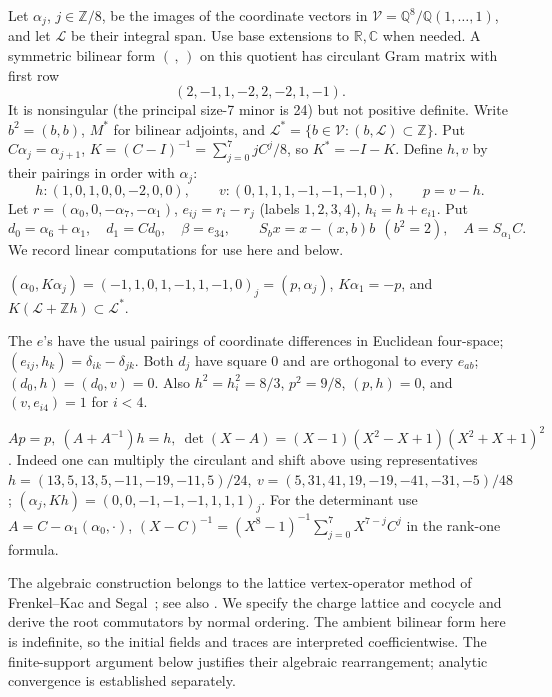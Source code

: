 Let \(\alpha_j\), \(j\in\mathbb Z/8\), be the images of the coordinate vectors in \(\mathcal V=\mathbb Q^8/\mathbb Q(1,\ldots,1)\), and let \(\mathcal L\) be their integral span. Use base extensions to \(\mathbb R,\mathbb C\) when needed. A symmetric bilinear form \((\, ,\,)\) on this quotient has circulant Gram matrix with first row
\[
 (2,-1,1,-2,2,-2,1,-1).
\]
It is nonsingular (the principal size-7 minor is 24) but not positive definite. Write \(b^2=(b,b)\), \(M^*\) for bilinear adjoints, and \(\mathcal L^*=\{b\in\mathcal V:(b,\mathcal L)\subset\mathbb Z\}\). Put \(C\alpha_j=\alpha_{j+1}\), \(K=(C-I)^{-1}=\sum_{j=0}^7 j C^j/8\), so \(K^*=-I-K\). Define \(h,v\) by their pairings in order with \(\alpha_j\):
\[
 h:(1,0,1,0,0,-2,0,0),\qquad v:(0,1,1,1,-1,-1,-1,0),\qquad p=v-h.
\]
Let \(r=(\alpha_0,0,-\alpha_7,-\alpha_1)\), \(e_{ij}=r_i-r_j\) (labels \(1,2,3,4\)), \(h_i=h+e_{i1}\). Put
\[
 d_0=\alpha_6+\alpha_1,\quad d_1=Cd_0,\quad \beta=e_{34},\qquad
 S_b x=x-(x,b)b\ \ (b^2=2),\quad A=S_{\alpha_1} C .
\]
We record linear computations for use here and below.
\par\noindent\textbullet\quad \((\alpha_0,K\alpha_j)=(-1,1,0,1,-1,1,-1,0)_j=(p,\alpha_j)\), \(K\alpha_1=-p\), and \(K(\mathcal L+\mathbb Z h)\subset\mathcal L^*\).
\par\noindent\textbullet\quad The \(e\)'s have the usual pairings of coordinate differences in Euclidean four-space; \((e_{ij},h_k)=\delta_{ik}-\delta_{jk}\). Both \(d_j\) have square 0 and are orthogonal to every \(e_{ab}\); \((d_0,h)=(d_0,v)=0\). Also \(h^2=h_i^2=8/3\), \(p^2=9/8\), \((p,h)=0\), and \((v,e_{i4})=1\) for \(i<4\).
\par\noindent\textbullet\quad \(Ap=p,\ (A+A^{-1})h=h,\ \det(X-A)=(X-1)(X^2-X+1)(X^2+X+1)^2\).
Indeed one can multiply the circulant and shift above using representatives \(h=(13,5,13,5,-11,-19,-11,5)/24,\ v=(5,31,41,19,-19,-41,-31,-5)/48\); \((\alpha_j,Kh)=(0,0,-1,-1,-1,1,1,1)_j\). For the determinant use \(A=C-\alpha_1(\alpha_0,\cdot)\), \((X-C)^{-1}=(X^8-1)^{-1}\sum_{j=0}^7 X^{7-j} C^j\) in the rank-one formula.

The algebraic construction belongs to the lattice vertex-operator method of Frenkel--Kac and Segal~\cite{FrenkelKac1980,Segal1981}; see also \cite[Section~2.1]{Frenkel1985}. We specify the charge lattice and cocycle and derive the root commutators by normal ordering. The ambient bilinear form here is indefinite, so the initial fields and traces are interpreted coefficientwise. The finite-support argument below justifies their algebraic rearrangement; analytic convergence is established separately.


